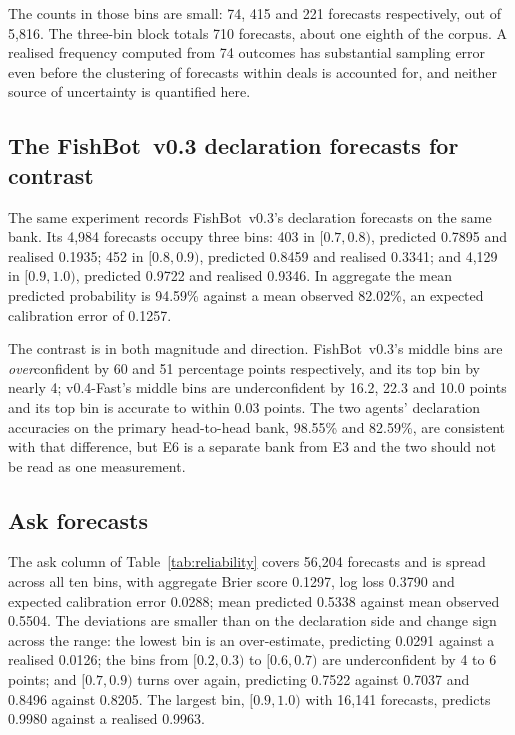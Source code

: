 \documentclass[11pt]{article}
\theoremstyle{definition}
\DeclareRobustCommand{\vfast}{\texorpdfstring{\mbox{v0.4-Fast}}{v0.4-Fast}}
\DeclareRobustCommand{\vthree}{\texorpdfstring{\mbox{FishBot v0.3}}{FishBot v0.3}}
\newcommand{\numVsVthreeDeclAcc}{98.55}
\newcommand{\numVthreeDeclAccSame}{82.59}
\newcommand{\numDeclN}{5{,}816}
\newcommand{\numAskECE}{0.0288}
\newcommand{\numAskBrier}{0.1297}
\newcommand{\numAskN}{56{,}204}
\newcommand{\numAskLogLoss}{0.3790}
\newcommand{\numVthreeDeclECE}{0.1257}
\newcommand{\numVthreeDeclPred}{94.59}
\newcommand{\numVthreeDeclObs}{82.02}
\newcommand{\numVthreeDeclN}{4{,}984}
\begin{document}
The counts in those bins are small: 74, 415 and 221 forecasts respectively, out
of \numDeclN{}. The three-bin block totals 710 forecasts, about one eighth of
the corpus. A realised frequency computed from 74 outcomes has substantial
sampling error even before the clustering of forecasts within deals is
accounted for, and neither source of uncertainty is quantified here.

\subsection{The \vthree{} declaration forecasts for contrast}
\label{app:calib-v03}

The same experiment records \vthree{}'s declaration forecasts on the same bank.
Its \numVthreeDeclN{} forecasts occupy three bins: 403 in $[0.7,0.8)$, predicted
0.7895 and realised 0.1935; 452 in $[0.8,0.9)$, predicted 0.8459 and realised
0.3341; and 4{,}129 in $[0.9,1.0)$, predicted 0.9722 and realised 0.9346. In
aggregate the mean predicted probability is \numVthreeDeclPred\% against a mean
observed \numVthreeDeclObs\%, an expected calibration error of
\numVthreeDeclECE{}.

The contrast is in both magnitude and direction. \vthree{}'s middle bins are
\emph{over}confident by 60 and 51 percentage points respectively, and its top
bin by nearly 4; \vfast{}'s middle bins are underconfident by 16.2, 22.3 and
10.0 points and its top bin is accurate to within 0.03 points. The two agents' declaration
accuracies on the primary head-to-head bank, \numVsVthreeDeclAcc\% and
\numVthreeDeclAccSame\%, are consistent with that difference, but E6 is a
separate bank from E3 and the two should not be read as one measurement.

\subsection{Ask forecasts}
\label{app:calib-ask}

The ask column of Table~\ref{tab:reliability} covers \numAskN{} forecasts and is
spread across all ten bins, with aggregate Brier score \numAskBrier{}, log loss
\numAskLogLoss{} and expected calibration error \numAskECE{}; mean predicted
0.5338 against mean observed 0.5504. The deviations are smaller than on the
declaration side and change sign across the range: the lowest bin is
an over-estimate, predicting 0.0291 against a realised 0.0126; the
bins from $[0.2,0.3)$ to $[0.6,0.7)$ are underconfident by 4 to 6 points; and
$[0.7,0.9)$ turns over again, predicting 0.7522 against 0.7037 and 0.8496
against 0.8205. The largest bin, $[0.9,1.0)$ with 16{,}141 forecasts, predicts
0.9980 against a realised 0.9963.
\end{document}
